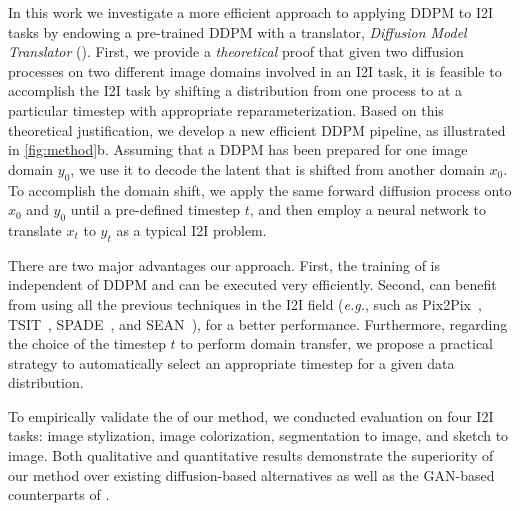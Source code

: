 In this work\sqq{,} we investigate a more efficient approach to applying DDPM to I2I tasks by endowing a pre-trained DDPM with a translator,  {\em Diffusion Model Translator} (\method).
%
First, we provide a \textit{theoretical} proof that given two diffusion processes on two different image domains involved in an I2I task, it is feasible to accomplish the I2I task by shifting a distribution from one process to  at a particular timestep with appropriate reparameterization.
%
Based on this theoretical justification, we develop a new efficient DDPM pipeline, as illustrated in \cref{fig:method}b.
%
Assuming that a DDPM has been prepared for one image domain $y_0$, we use it to decode the latent that is shifted from another domain $x_0$.
%
To accomplish the domain shift, we apply the same forward diffusion process onto $x_0$ and $y_0$ until a pre-defined timestep $t$, and then employ a neural network to translate $x_t$ to $y_t$ as a typical I2I problem.

There are two major advantages  our approach.
%
First, the training of \method is independent of DDPM and can be executed very efficiently.
%
Second, \method can benefit from using all the previous techniques in the I2I field (\textit{e.g.}, such as Pix2Pix~\cite{isola2017image}, TSIT~\cite{jiang2020tsit}, SPADE~\cite{park2019SPADE}, and SEAN~\cite{Zhu_2020_CVPR}), for a better performance.
%
Furthermore, regarding the choice of the timestep $t$ to perform domain transfer, we propose a practical strategy to automatically select an appropriate timestep for a given data distribution.

To empirically validate the  of our method, we conducted evaluation on four I2I tasks: image stylization, image colorization, segmentation to image, and sketch to image.
%
Both qualitative and quantitative results demonstrate the superiority of our method over existing diffusion-based alternatives as well as the GAN-based counterparts of \method.

%
%


